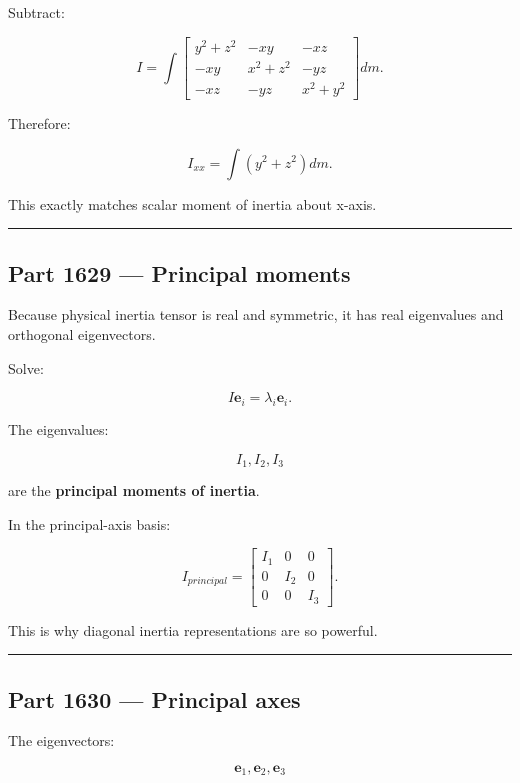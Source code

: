 Subtract:

\[
I=
\int
\begin{bmatrix}
y^2+z^2&-xy&-xz\\
-xy&x^2+z^2&-yz\\
-xz&-yz&x^2+y^2
\end{bmatrix}
dm.
\]

Therefore:

\[
I_{xx}
=
\int(y^2+z^2)dm.
\]

This exactly matches scalar moment of inertia about x-axis.

\begin{center}\rule{0.5\linewidth}{0.5pt}\end{center}

\subsection{Part 1629 --- Principal moments}\label{06-engine-ii-ch035-part-1629-principal-moments}

Because physical inertia tensor is real and symmetric, it has real eigenvalues and orthogonal eigenvectors.

Solve:

\[
I\mathbf{e}_i
=
\lambda_i\mathbf{e}_i.
\]

The eigenvalues:

\[
\boxed{
I_1,I_2,I_3
}
\]

are the \textbf{principal moments of inertia}.

In the principal-axis basis:

\[
I_{principal}
=
\begin{bmatrix}
I_1&0&0\\
0&I_2&0\\
0&0&I_3
\end{bmatrix}.
\]

This is why diagonal inertia representations are so powerful.

\begin{center}\rule{0.5\linewidth}{0.5pt}\end{center}

\subsection{Part 1630 --- Principal axes}\label{06-engine-ii-ch035-part-1630-principal-axes}

The eigenvectors:

\[
\mathbf{e}_1,\mathbf{e}_2,\mathbf{e}_3
\]

